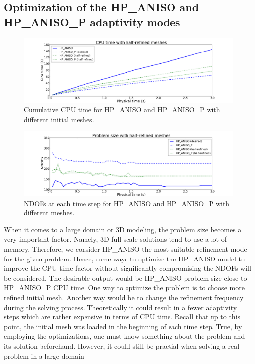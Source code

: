 \subsection{Optimization of the HP\_ANISO and HP\_ANISO\_P adaptivity modes}

\begin{figure}[!ht]
  \begin{centering}
  \includegraphics[width=\columnwidth]{refined_cpu}
  \caption{\label{fig:refined-cpu} Cumulative CPU time for HP\_ANISO and HP\_ANISO\_P
  with different initial meshes.}
  \end{centering}
\end{figure}

\begin{figure}[!ht]
  \begin{centering}
  \includegraphics[width=\columnwidth]{refined_dof}
  \caption{\label{fig:refined-dof} NDOFs at each time step for
  HP\_ANISO and HP\_ANISO\_P with different meshes.}
  \end{centering}
\end{figure}

When it comes to a large domain or 3D modeling, the problem
size becomes a very important factor. Namely, 3D full scale solutions tend to use
a lot of memory. Therefore, we consider HP\_ANISO the most
suitable refinement mode for the given problem. 
Hence, some ways to optimize the HP\_ANISO model
to improve the CPU time factor without significantly 
compromising the NDOFs will be considered. 
The desirable output would be HP\_ANISO problem size
close to HP\_ANISO\_P CPU time. 
One way to optimize the problem
is to choose more refined initial mesh. Another way would be to change
the refinement frequency during the solving process. Theoretically it 
could result in a fewer adaptivity steps which are rather expensive in terms
of CPU time. Recall that up to this point,
the initial mesh was loaded in the beginning of each time step. 
True, by employing the optimizations, one must know something about the problem
and its solution beforehand. However, it could still be practial when solving a real problem
in a large domain.

